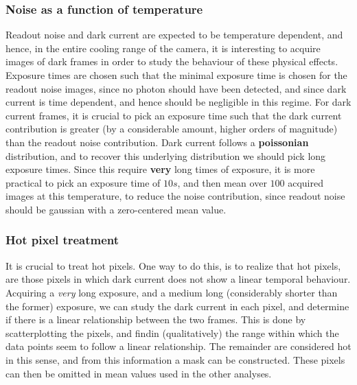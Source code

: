 \documentclass[../main.tex]{subfiles}
\begin{document}
		\subsubsection{Noise as a function of temperature}
		Readout noise and dark current are expected to be temperature dependent, and hence, in the entire cooling range of the camera, it is interesting to acquire images of dark frames in order to study the behaviour of these physical effects. Exposure times are chosen such that the minimal exposure time is chosen for the readout noise images, since no photon should have been detected, and since dark current is time dependent, and hence should be negligible in this regime. For dark current frames, it is crucial to pick an exposure time such that the dark current contribution is greater (by a considerable amount, higher orders of magnitude) than the readout noise contribution. Dark current follows a \textbf{poissonian} distribution, and to recover this underlying distribution we should pick long exposure times. Since this require \textbf{very} long times of exposure, it is more practical to pick an exposure time of $10s$, and then mean over $100$ acquired images at this temperature, to reduce the noise contribution, since readout noise should be gaussian with a zero-centered mean value. 
		
		\subsubsection{Hot pixel treatment}
		It is crucial to treat hot pixels. One way to do this, is to realize that hot pixels, are those pixels in which dark current does not show a linear temporal behaviour. Acquiring a \textit{very} long exposure, and a medium long (considerably shorter than the former) exposure, we can study the dark current in each pixel, and determine if there is a linear relationship between the two frames. This is done by scatterplotting the pixels, and findin (qualitatively) the range within which the data points seem to follow a linear relationship. The remainder are considered hot in this sense, and from this information a mask can be constructed. These pixels can then be omitted in mean values used in the other analyses.
		
\end{document}
